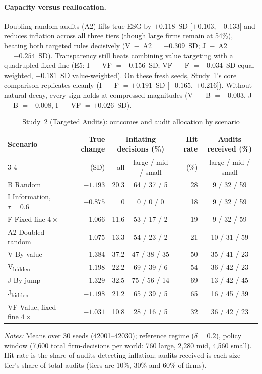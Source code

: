 \documentclass[11pt]{article}
\newcommand{\Vh}{V\textsubscript{hidden}}
\newcommand{\Jh}{J\textsubscript{hidden}}
\begin{document}
\paragraph{Capacity versus reallocation.}
Doubling random audits (A2) lifts true ESG by $+0.118$~SD [$+0.103$, $+0.133$] and reduces inflation across all three tiers (though large firms remain at 54\%), beating both targeted rules decisively (V~$-$~A2 $= -0.309$~SD; J~$-$~A2 $= -0.254$~SD). Transparency still beats combining value targeting with a quadrupled fixed fine (E5: I~$-$~VF $= +0.156$~SD; VF~$-$~F $= +0.034$~SD equal-weighted, $+0.181$~SD value-weighted). On these fresh seeds, Study~1's core comparison replicates cleanly (I~$-$~F $= +0.191$~SD [$+0.165$, $+0.216$]). Without natural decay, every sign holds at compressed magnitudes (V~$-$~B $= -0.003$, J~$-$~B $= -0.008$, I~$-$~VF $= +0.026$~SD).

\begin{table}[t]
\centering
\small
\begin{threeparttable}
\caption{Study~2 (Targeted Audits): outcomes and audit allocation by scenario}
\label{tab:audit_describe}
\begin{tabular}{@{}lrrcrc@{}}
\toprule
Scenario & True change & \multicolumn{2}{c}{Inflating decisions (\%)} & Hit rate & Audits received (\%) \\
\cmidrule(lr){3-4}
 & (SD) & all & large / mid / small & (\%) & large / mid / small \\
\midrule
B Random & $-1.193$ & 20.3 & 64 / 37 / 5 & 28 & 9 / 32 / 59 \\
I Information, $\tau = 0.6$ & $-0.875$ & 0 & 0 / 0 / 0 & 18 & 9 / 32 / 59 \\
F Fixed fine $4\times$ & $-1.066$ & 11.6 & 53 / 17 / 2 & 19 & 9 / 32 / 59 \\
A2 Doubled random & $-1.075$ & 13.3 & 54 / 23 / 2 & 21 & 10 / 31 / 59 \\
V By value & $-1.384$ & 37.2 & 47 / 38 / 35 & 50 & 35 / 41 / 23 \\
\Vh & $-1.198$ & 22.2 & 69 / 39 / 6 & 54 & 36 / 42 / 23 \\
J By jump & $-1.329$ & 32.5 & 75 / 56 / 14 & 69 & 13 / 42 / 45 \\
\Jh & $-1.198$ & 21.2 & 65 / 39 / 5 & 65 & 16 / 45 / 39 \\
VF Value, fixed fine $4\times$ & $-1.031$ & 10.8 & 28 / 16 / 5 & 32 & 36 / 42 / 23 \\
\bottomrule
\end{tabular}
\begin{tablenotes}[flushleft]\footnotesize
\item \textit{Notes:} Means over 30 seeds (42001--42030); reference regime ($\delta = 0.2$), policy window (7,600 total firm-decisions per world: 760 large, 2,280 mid, 4,560 small). Hit rate is the share of audits detecting inflation; audits received is each size tier's share of total audits (tiers are 10\%, 30\% and 60\% of firms).
\end{tablenotes}
\end{threeparttable}
\end{table}
\end{document}
